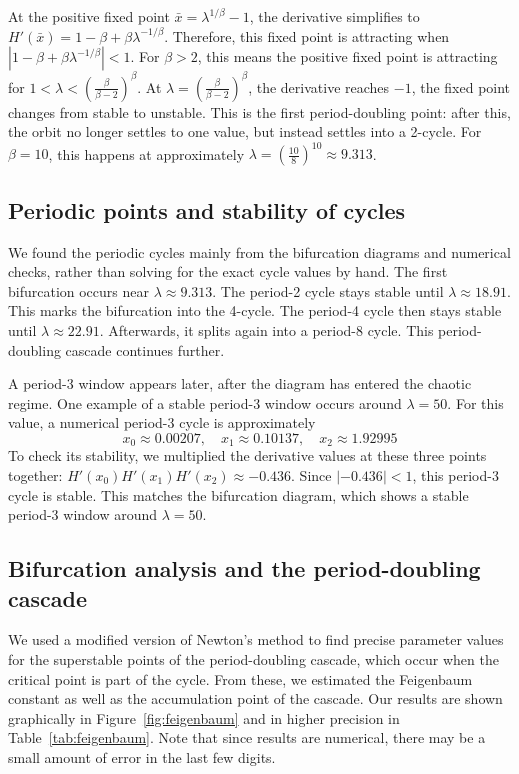 \documentclass[12pt]{article}
\begin{document}
At the positive fixed point $\bar{x}=\lambda^{1/\beta}-1$, the derivative simplifies to
$H'(\bar{x}) = 1-\beta+\beta\lambda^{-1/\beta}$. Therefore, this fixed point is attracting when $\left|1-\beta+\beta\lambda^{-1/\beta}\right|<1$. For $\beta>2$, this means the positive fixed point is attracting for $1<\lambda<\left(\frac{\beta}{\beta-2}\right)^\beta$. At $\lambda=\left(\frac{\beta}{\beta-2}\right)^\beta$,
the derivative reaches $-1$, the fixed point changes from stable to unstable. This is the first period-doubling point: after this, the orbit no longer settles to one value, but instead settles into a 2-cycle. For $\beta = 10$, this happens at approximately $\lambda=\left(\frac{10}{8}\right)^{10}\approx 9.313$.

\subsection{Periodic points and stability of cycles}
We found the periodic cycles mainly from the bifurcation diagrams and numerical checks, rather than solving for the exact cycle values by hand. The first bifurcation occurs near $\lambda \approx 9.313$. The period-2 cycle stays stable until $\lambda \approx 18.91$. This marks the bifurcation into the 4-cycle. The period-4 cycle then stays stable until $\lambda \approx 22.91$.
Afterwards, it splits again into a period-8 cycle. This period-doubling cascade continues further.

A period-3 window appears later, after the diagram has entered the chaotic regime. One example of a stable period-3 window occurs around $\lambda = 50$. For this value, a numerical period-3 cycle is approximately
\[
x_0 \approx 0.00207,\quad
x_1 \approx 0.10137,\quad
x_2 \approx 1.92995
\]
To check its stability, we multiplied the derivative values at these three points together:
$H'(x_0)H'(x_1)H'(x_2) \approx -0.436$. Since $|-0.436|<1$, this period-3 cycle is stable. This matches the bifurcation diagram, which shows a stable period-3 window around $\lambda = 50$.

\subsection{Bifurcation analysis and the period-doubling cascade}

We used a modified version of Newton's method to find precise parameter values for the superstable points of the period-doubling cascade, which occur when the critical point is part of the cycle. From these, we estimated the Feigenbaum constant as well as the accumulation point of the cascade. Our results are shown graphically in Figure~\ref{fig:feigenbaum} and in higher precision in Table~\ref{tab:feigenbaum}. Note that since results are numerical, there may be a small amount of error in the last few digits.
\end{document}
